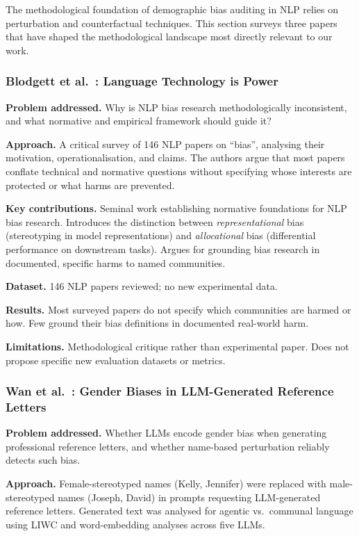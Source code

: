 \documentclass[12pt,a4paper]{article}
\begin{document}
The methodological foundation of demographic bias auditing in NLP relies on
perturbation and counterfactual techniques. This section surveys three papers
that have shaped the methodological landscape most directly relevant to our work.

\subsubsection*{Blodgett et al.\ \cite{blodgett2020}: Language Technology is Power}

\textbf{Problem addressed.}
Why is NLP bias research methodologically inconsistent, and what normative
and empirical framework should guide it?

\textbf{Approach.}
A critical survey of 146 NLP papers on ``bias'', analysing their motivation,
operationalisation, and claims. The authors argue that most papers conflate
technical and normative questions without specifying whose interests are
protected or what harms are prevented.

\textbf{Key contributions.}
Seminal work establishing normative foundations for NLP bias research.
Introduces the distinction between \emph{representational} bias (stereotyping
in model representations) and \emph{allocational} bias (differential
performance on downstream tasks). Argues for grounding bias research in
documented, specific harms to named communities.

\textbf{Dataset.}
146 NLP papers reviewed; no new experimental data.

\textbf{Results.}
Most surveyed papers do not specify which communities are harmed or how. Few
ground their bias definitions in documented real-world harm.

\textbf{Limitations.}
Methodological critique rather than experimental paper. Does not propose
specific new evaluation datasets or metrics.

\subsubsection*{Wan et al.\ \cite{wan2023}: Gender Biases in LLM-Generated
Reference Letters}

\textbf{Problem addressed.}
Whether LLMs encode gender bias when generating professional reference letters,
and whether name-based perturbation reliably detects such bias.

\textbf{Approach.}
Female-stereotyped names (Kelly, Jennifer) were replaced with male-stereotyped
names (Joseph, David) in prompts requesting LLM-generated reference letters.
Generated text was analysed for agentic vs.\ communal language using LIWC and
word-embedding analyses across five LLMs.
\end{document}
